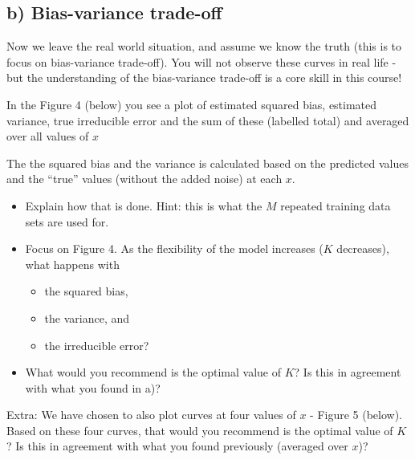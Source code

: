 \documentclass[]{article}
\providecommand{\tightlist}{%
  \setlength{\itemsep}{0pt}\setlength{\parskip}{0pt}}
\begin{document}
\hypertarget{b-bias-variance-trade-off}{%
\subsection{b) Bias-variance
trade-off}\label{b-bias-variance-trade-off}}

Now we leave the real world situation, and assume we know the truth
(this is to focus on bias-variance trade-off). You will not observe
these curves in real life - but the understanding of the bias-variance
trade-off is a core skill in this course!

In the Figure 4 (below) you see a plot of estimated squared bias,
estimated variance, true irreducible error and the sum of these
(labelled total) and averaged over all values of \(x\)

The the squared bias and the variance is calculated based on the
predicted values and the ``true'' values (without the added noise) at
each \(x\).

\begin{itemize}
\tightlist
\item
  Explain how that is done. Hint: this is what the \(M\) repeated
  training data sets are used for.
\item
  Focus on Figure 4. As the flexibility of the model increases (\(K\)
  decreases), what happens with

  \begin{itemize}
  \tightlist
  \item
    the squared bias,\\
  \item
    the variance, and\\
  \item
    the irreducible error?
  \end{itemize}
\item
  What would you recommend is the optimal value of \(K\)? Is this in
  agreement with what you found in a)?
\end{itemize}

Extra: We have chosen to also plot curves at four values of \(x\) -
Figure 5 (below). Based on these four curves, that would you recommend
is the optimal value of \(K\)? Is this in agreement with what you found
previously (averaged over \(x\))?
\end{document}
